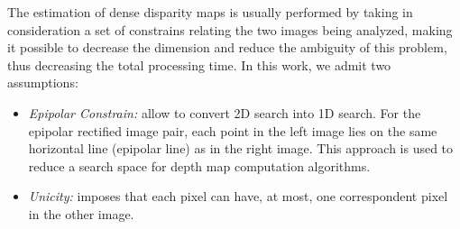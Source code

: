 \documentclass[conference]{IEEEtran}
\begin{document}
The estimation of dense disparity maps is usually performed by taking in consideration a set of constrains relating the two images being analyzed, making it possible to decrease the dimension and reduce the ambiguity of this problem, thus decreasing the total processing time. In this work, we admit two assumptions:
\begin{itemize}
	\item \textit{Epipolar Constrain:} allow to convert 2D search into 1D search. For the epipolar rectified image pair, each point in the left image lies on the same horizontal line (epipolar line) as in the right image. This approach is used to reduce a search space for depth map computation algorithms.
	\item \textit{Unicity:} imposes that each pixel can have, at most, one correspondent pixel in the other image.
\end{itemize}
\end{document}
